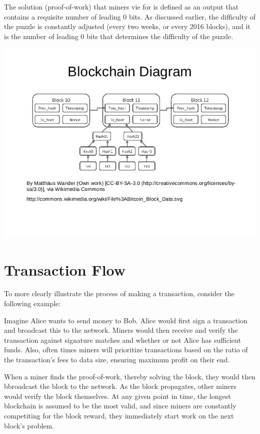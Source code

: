 \documentclass[11pt]{article}
\begin{document}
    The solution (proof-of-work) that miners vie for is defined as an output that contains a requisite number of leading 0 bits. As discussed earlier, the difficulty of the puzzle is constantly adjusted (every two weeks, or every 2016 blocks), and it is the number of leading 0 bits that determines the difficulty of the puzzle. 
    
   \includegraphics[scale=0.65]{blockchain_diagram}
   
   \section*{Transaction Flow}
   
   To more clearly illustrate the process of making a transaction, consider the following example:
   
   Imagine Alice wants to send money to Bob. Alice would first sign a transaction and broadcast this to the network. Miners would then receive and verify the transaction against signature matches and whether or not Alice has sufficient funds. Also, often times miners will prioritize transactions based on the ratio of the transaction's fees to data size, ensuring maximum profit on their end. 
   
   When a miner finds the proof-of-work, thereby solving the block, they would then bbroadcast the block to the network. As the block propagates, other miners would verify the block themselves. At any given point in time, the longest blockchain is assumed to be the most valid, and since miners are constantly competiting for the block reward, they immediately start work on the next block's problem.
   
\end{document}
